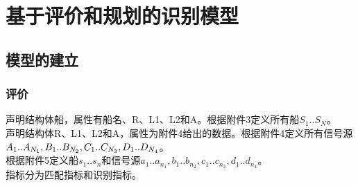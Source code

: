 \clearpage
\section{基于评价和规划的识别模型}
\subsection{模型的建立}
\subsubsection{评价}
声明结构体船，属性有船名、R、L1、L2和A。根据附件3定义所有船\(S_1..S_N\)。
\\\indent 声明结构体R、L1、L2和A，属性为附件4给出的数据。根据附件4定义所有信号源\(A_1..A_{N_1},\\B_1..B_{N_2},C_1..C_{N_3},D_1..D_{N_4}\)。
\\\indent 根据附件5定义船\(s_1..s_n\)和信号源\(a_1..a_{n_1},b_1..b_{n_2},c_1..c_{n_3},d_1..d_{n_4}\)。
\\\indent 指标分为匹配指标和识别指标。
